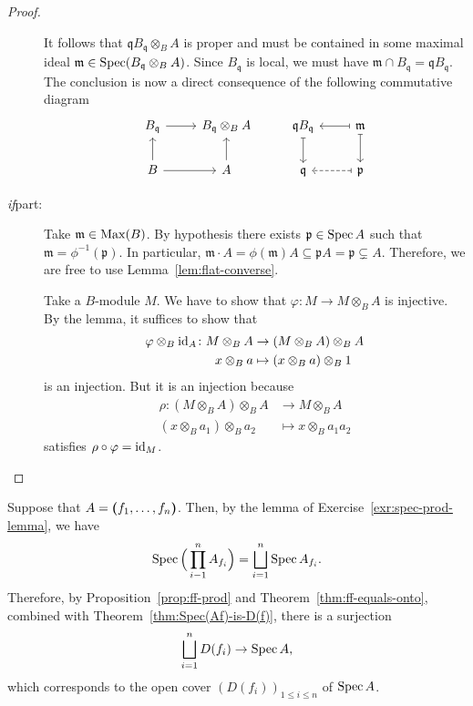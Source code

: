 \begin{proof}
\begin{description}
        It follows that $\mathfrak qB_{\mathfrak q}\otimes_BA$ is proper and must be contained in some maximal ideal $\mathfrak m\in\operatorname{Spec}(B_{\mathfrak q}\otimes_BA)$. Since $B_{\mathfrak q}$ is local, we must have $\mathfrak m\cap B_{\mathfrak q} = \mathfrak qB_{\mathfrak q}$. The conclusion is now a direct consequence of the following commutative diagram
        $$
        \begin{tikzcd}
            B_{\mathfrak q}
                    \arrow[r]
                &B_{\mathfrak q}\otimes_BA
                &\mathfrak qB_{\mathfrak q}
                    \arrow[d,mapsto]
                &\mathfrak m
                    \arrow[l,mapsto]
                    \arrow[d,mapsto]\\
            B\arrow[u]
                    \arrow[r]
                &A
                    \arrow[u]
                &\mathfrak q
                &\mathfrak p
                    \arrow[l,dashed,mapsto]
        \end{tikzcd}
        $$
        
        \item[\rm\textit{if\/}part:] Take $\mathfrak m\in\operatorname{Max}(B)$. By hypothesis there exists $\mathfrak p\in\operatorname{Spec} A$ such that $\mathfrak m=\phi^{-1}(\mathfrak p)$. In particular, $\mathfrak m\cdot A= \phi(\mathfrak m)A\subseteq\mathfrak pA=\mathfrak p\varsubsetneq A$. Therefore, we are free to use Lemma~\ref{lem:flat-converse}.
        
        Take a $B$-module $M$. We have to show that $\varphi\colon M\to M\otimes_BA$ is injective. By the lemma, it suffices to show that
        \begin{align*}
            \varphi\otimes_B\text{\rm id}_A\colon M\otimes_BA
                &\to (M\otimes_BA)\otimes_BA\\
                x\otimes_Ba&\mapsto(x\otimes_Ba)\otimes_B1
        \end{align*}
        is an injection. But it is an injection because
        \begin{align*}
            \rho\colon(M\otimes_BA)\otimes_BA&\to M\otimes_BA\\
            (x\otimes_Ba_1)\otimes_Ba_2&\mapsto x\otimes_Ba_1a_2
        \end{align*}
        satisfies $\rho\circ\varphi=\text{\rm id}_M$.
    \end{description}
\end{proof}

\begin{rem}
    Suppose that $A = \textrm{\boldmath$($}f_1,\dots,f_n\textrm{\boldmath$)$}$. Then, by the lemma of Exercise~\ref{exr:spec-prod-lemma}, we have
    $$
        \operatorname{Spec}\Big(\prod_{i-1}^nA_{f_i}\Big) = \bigsqcup_{i=1}^n\operatorname{Spec} A_{f_i}.
    $$
    Therefore, by Proposition~\ref{prop:ff-prod} and Theorem~\ref{thm:ff-equals-onto}, combined with Theorem~\ref{thm:Spec(Af)-is-D(f)}, there is a surjection
    $$
        \bigsqcup_{i=1}^nD(f_i)\to\operatorname{Spec} A,
    $$
    which corresponds to the open cover $(D(f_i))_{1\le i\le n}$ of $\operatorname{Spec} A$.
\end{rem}

